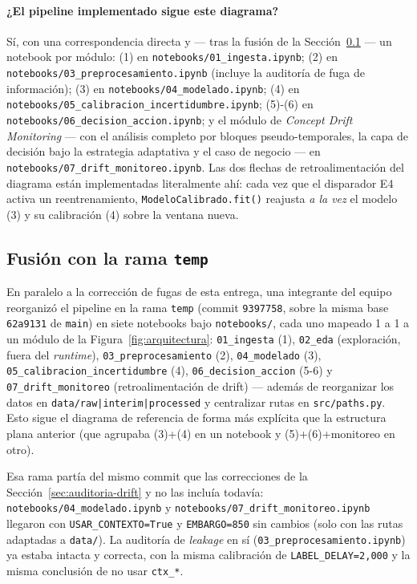 \documentclass[11pt,a4paper]{article}
\newcommand{\nb}[1]{\texttt{notebooks/}\allowbreak\texttt{#1}}
\begin{document}
\paragraph{¿El pipeline implementado sigue este diagrama?} Sí, con una correspondencia directa y --- tras la fusión de la Sección~\ref{sec:temp-branch} --- un notebook por módulo: (1) en \nb{01\_ingesta.ipynb}; (2) en \nb{03\_preprocesamiento.ipynb} (incluye la auditoría de fuga de información); (3) en \nb{04\_modelado.ipynb}; (4) en \nb{05\_calibracion\_incertidumbre.ipynb}; (5)-(6) en \nb{06\_decision\_accion.ipynb}; y el módulo de \emph{Concept Drift Monitoring} --- con el análisis completo por bloques pseudo-temporales, la capa de decisión bajo la estrategia adaptativa y el caso de negocio --- en \nb{07\_drift\_monitoreo.ipynb}. Las dos flechas de retroalimentación del diagrama están implementadas literalmente ahí: cada vez que el disparador E4 activa un reentrenamiento, \texttt{ModeloCalibrado.fit()} reajusta \emph{a la vez} el modelo (3) y su calibración (4) sobre la ventana nueva.

\subsection{Fusión con la rama \texttt{temp}}
\label{sec:temp-branch}

En paralelo a la corrección de fugas de esta entrega, una integrante del equipo reorganizó el pipeline en la rama \texttt{temp} (commit \texttt{9397758}, sobre la misma base \texttt{62a9131} de \texttt{main}) en siete notebooks bajo \nb{}, cada uno mapeado 1 a 1 a un módulo de la Figura~\ref{fig:arquitectura}: \texttt{01\_ingesta} (1), \texttt{02\_eda} (exploración, fuera del \emph{runtime}), \texttt{03\_preprocesamiento} (2), \texttt{04\_modelado} (3), \texttt{05\_calibracion\_incertidumbre} (4), \texttt{06\_decision\_accion} (5-6) y \texttt{07\_drift\_monitoreo} (retroalimentación de drift) --- además de reorganizar los datos en \texttt{data/raw|interim|processed} y centralizar rutas en \texttt{src/paths.py}. Esto sigue el diagrama de referencia de forma más explícita que la estructura plana anterior (que agrupaba (3)+(4) en un notebook y (5)+(6)+monitoreo en otro).

Esa rama partía del mismo commit que las correcciones de la Sección~\ref{sec:auditoria-drift} y no las incluía todavía: \nb{04\_modelado.ipynb} y \nb{07\_drift\_monitoreo.ipynb} llegaron con \texttt{USAR\_CONTEXTO=True} y \texttt{EMBARGO=850} sin cambios (solo con las rutas adaptadas a \texttt{data/}). La auditoría de \emph{leakage} en sí (\texttt{03\_preprocesamiento.ipynb}) ya estaba intacta y correcta, con la misma calibración de \texttt{LABEL\_DELAY=2{,}000} y la misma conclusión de no usar \texttt{ctx\_*}.
\end{document}

